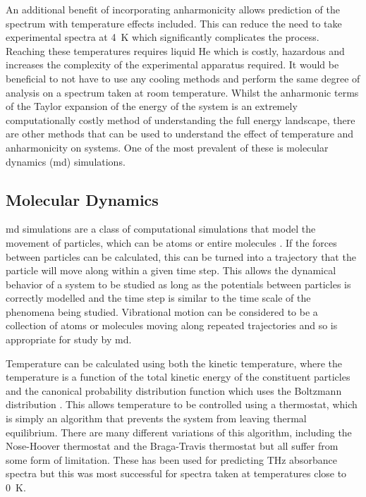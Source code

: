 An additional benefit of incorporating anharmonicity allows prediction of the spectrum with temperature effects included. This can reduce the need to take experimental spectra at \SI{4}{K} which significantly complicates the process. Reaching these temperatures requires liquid He which is costly, hazardous and increases the complexity of the experimental apparatus required. It would be beneficial to not have to use any cooling methods and perform the same degree of analysis on a spectrum taken at room temperature. Whilst the anharmonic terms of the Taylor expansion of the energy of the system is an extremely computationally costly method of understanding the full energy landscape, there are other methods that can be used to understand the effect of temperature and anharmonicity on systems. One of the most prevalent of these is molecular dynamics (\acrshort{md}) simulations.

\subsection{Molecular Dynamics}
\acrshort{md} simulations are a class of computational simulations that model the movement of particles, which can be atoms or entire molecules \cite{Fermi1955}. If the forces between particles can be calculated, this can be turned into a trajectory that the particle will move along within a given time step. This allows the dynamical behavior of a system to be studied as long as the potentials between particles is correctly modelled and the time step is similar to the time scale of the phenomena being studied. Vibrational motion can be considered to be a collection of atoms or molecules moving along repeated trajectories and so is appropriate for study by \acrshort{md}. 

Temperature can be calculated using both the kinetic temperature, where the temperature is a function of the total kinetic energy of the constituent particles and the canonical probability distribution function which uses the Boltzmann distribution \cite{Sri2021}. This allows temperature to be controlled using a thermostat, which is simply an algorithm that prevents the system from leaving thermal equilibrium. There are many different variations of this algorithm, including the Nose\nobreakdash-Hoover thermostat \cite{Braka2003} and the Braga\nobreakdash-Travis thermostat \cite{Patra2014} but all suffer from some form of limitation. These has been used for predicting THz absorbance spectra \cite{Dai2020} but this was most successful for spectra taken at temperatures close to \SI{0}{K}. 

